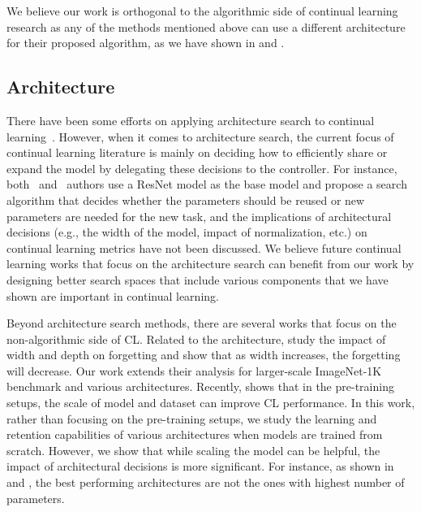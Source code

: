  

We believe our work is orthogonal to the algorithmic side of continual learning research as any of the methods mentioned above can use a different architecture for their proposed algorithm, as we have shown in  and .

\subsection{Architecture}
There have been some efforts on applying architecture search to continual learning~\citep{ReinforcedCL,NASCIL,ENAS-CL,LearnToGrow,pmlr-v139-lee21a}. However, when it comes to architecture search, the current focus of continual learning literature is mainly on deciding how to efficiently share or expand the model by delegating these decisions to the controller. For instance, both~\citet{pmlr-v139-lee21a} and~\citet{pmlr-v139-lee21a} authors use a ResNet model as the base model and propose a search algorithm that decides whether the parameters should be reused or new parameters are needed for the new task, and the implications of architectural decisions (e.g., the width of the model, impact of normalization, etc.) on continual learning metrics have not been discussed. We believe future continual learning works that focus on the architecture search can benefit from our work by designing better search spaces that include various components that we have shown are important in continual learning. 

Beyond architecture search methods, there are several works that focus on the non-algorithmic side of CL. Related to the architecture, \citet{mirzadeh_understanding_continual} study the impact of width and depth on forgetting and show that as width increases, the forgetting will decrease. Our work extends their analysis for larger-scale ImageNet-1K benchmark and various architectures. Recently, \citet{EffectOfScaleInCL} shows that in the pre-training setups, the scale of model and dataset can improve CL performance. In this work, rather than focusing on the pre-training setups, we study the learning and retention capabilities of various architectures when models are trained from scratch. However, we show that while scaling the model can be helpful, the impact of architectural decisions is more significant. For instance, as shown in  and , the best performing architectures are not the ones with highest number of parameters.

